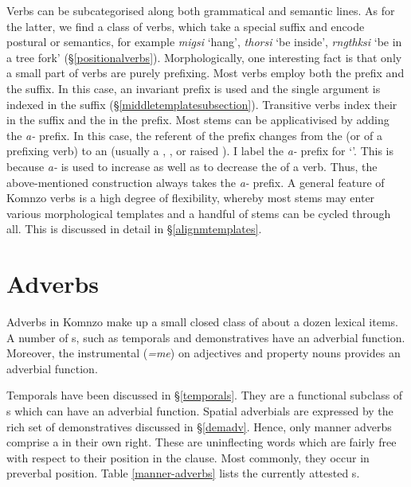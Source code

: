 Verbs can be subcategorised along both grammatical and semantic lines. As for the latter, we find a class of  verbs, which take a special  suffix and encode postural or  semantics, for example \emph{migsi} `hang', \emph{thorsi} `be inside', \emph{rngthksi} `be in a tree fork' (\S{}\ref{positionalverbs}). Morphologically, one interesting fact is that only a small part of  verbs are purely prefixing. Most  verbs employ both the prefix and the suffix. In this case, an invariant  prefix is used and the single argument is indexed in the suffix (\S{}\ref{middletemplatesubsection}). Transitive verbs index their  in the suffix and the  in the prefix. Most stems can be applicativised by adding the \emph{a-} prefix. In this case, the referent of the  prefix changes from the  (or  of a prefixing verb) to an  (usually a , , or raised ). I label the \emph{a-} prefix \Vc{} for `'. This is because \emph{a-} is used to increase as well as to decrease the  of a verb. Thus, the above-mentioned  construction always takes the \emph{a-} prefix. A general feature of Komnzo verbs is a high degree of flexibility, whereby most stems may enter various morphological templates and a handful of stems can be cycled through all. This is discussed in detail in \S{}\ref{alignmtemplates}.

\section{Adverbs} \label{adverbs}

Adverbs in Komnzo make up a small closed class of about a dozen lexical items. A number of s, such as temporals and demonstratives have an adverbial function. Moreover, the instrumental  (\emph{=me}) on adjectives and property nouns provides an adverbial function.%

Temporals have been discussed in \S{}\ref{temporals}. They are a functional subclass of s which can have an adverbial function. Spatial adverbials are expressed by the rich set of demonstratives discussed in \S{}\ref{demadv}. Hence, only manner adverbs comprise a  in their own right. These are uninflecting words which are fairly free with respect to their position in the clause. Most commonly, they occur in preverbal position. Table \ref{manner-adverbs} lists the currently attested s.

